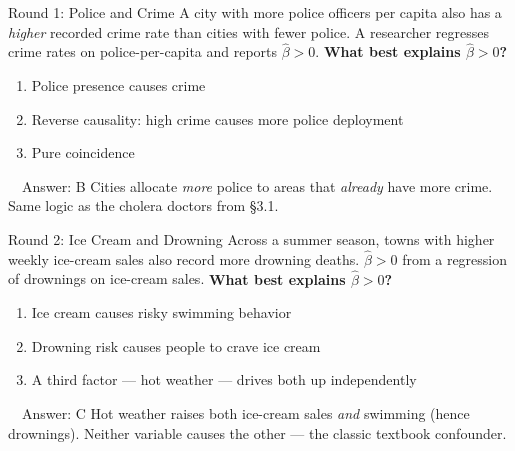 \documentclass[11pt,aspectratio=169]{beamer}
\begin{document}
\begin{frame}{Round 1: Police and Crime}
  \small
  A city with more police officers per capita also has a \emph{higher} recorded crime rate than cities with fewer police. A researcher regresses crime rates on police-per-capita and reports \(\hat\beta > 0\).
  \vspace{0.5em}
  \textbf{What best explains \(\hat\beta > 0\)?}
  \begin{enumerate}
    \item[\textbf{A}] Police presence causes crime
    \item[\textbf{B}] Reverse causality: high crime causes more police deployment
    \item[\textbf{C}] Pure coincidence
  \end{enumerate}
  \pause
  \vspace{0.3em}
  \begin{alertblock}{\faCheckCircle\ \ Answer: B}
    Cities allocate \emph{more} police to areas that \emph{already} have more crime. Same logic as the cholera doctors from \S3.1.
  \end{alertblock}
\end{frame}

\begin{frame}{Round 2: Ice Cream and Drowning}
  \small
  Across a summer season, towns with higher weekly ice-cream sales also record more drowning deaths. \(\hat\beta > 0\) from a regression of drownings on ice-cream sales.
  \vspace{0.5em}
  \textbf{What best explains \(\hat\beta > 0\)?}
  \begin{enumerate}
    \item[\textbf{A}] Ice cream causes risky swimming behavior
    \item[\textbf{B}] Drowning risk causes people to crave ice cream
    \item[\textbf{C}] A third factor --- hot weather --- drives both up independently
  \end{enumerate}
  \pause
  \vspace{0.3em}
  \begin{alertblock}{\faCheckCircle\ \ Answer: C}
    Hot weather raises both ice-cream sales \emph{and} swimming (hence drownings). Neither variable causes the other --- the classic textbook confounder.
  \end{alertblock}
\end{frame}
\end{document}
